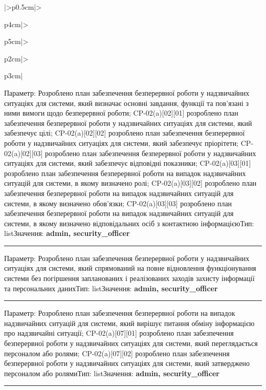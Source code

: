 \documentclass[10pt]{article}
\begin{document}
\begin{longtable}{|>{\centering\arraybackslash}p{0.5cm}|>{\raggedright\arraybackslash}p{4cm}|>{\raggedright\arraybackslash}p{5cm}|>{\raggedright\arraybackslash}p{2cm}|>{\raggedright\arraybackslash}p{3cm}|}
Параметр: Розроблено план забезпечення безперервної роботи у надзвичайних ситуаціях для системи, який визначає основні завдання, функції та пов'язані з ними вимоги щодо безперервної роботи; CP-02(a)[02][01] розроблено план забезпечення безперервної роботи у надзвичайних ситуаціях для системи, який забезпечує цілі; CP-02(a)[02][02] розроблено план забезпечення безперервної роботи у надзвичайних ситуаціях для системи, який забезпечує пріорітети; CP-02(a)[02][03] розроблено план забезпечення безперервної роботи у надзвичайних ситуаціях для системи, який забезпечує відповідні показники; CP-02(a)[03][01] розроблено план забезпечення безперервної роботи на випадок надзвичайних ситуацій для системи, в якому визначено ролі; CP-02(a)[03][02] розроблено план забезпечення безперервної роботи на випадок надзвичайних ситуацій для системи, в якому визначено обов'язки; CP-02(a)[03][03] розроблено план забезпечення безперервної роботи на випадок надзвичайних ситуацій для системи, в якому визначено відповідальних осіб з контактною інформацією\newline Тип: list\newline Значення: \textbf{admin, security\_\allowbreak{}officer}\vspace{1mm}\newline\noindent\rule{\linewidth}{0.4pt}\vspace{1mm}
Параметр: Розроблено план забезпечення безперервної роботи у надзвичайних ситуаціях для системи, який спрямований на повне відновлення функціонування системи без погіршення запланованих і реалізованих заходів захисту інформації та персональних даних\newline Тип: list\newline Значення: \textbf{admin, security\_\allowbreak{}officer}\vspace{1mm}\newline\noindent\rule{\linewidth}{0.4pt}\vspace{1mm}
Параметр: Розроблено план забезпечення безперервної роботи на випадок надзвичайних ситуацій для системи, який вирішує питання обміну інформацією про надзвичайні ситуації; CP-02(a)[07][01] розроблено план забезпечення безперервної роботи у надзвичайних ситуаціях для системи, який переглядається персоналом або ролями; CP-02(a)[07][02] розроблено план забезпечення безперервної роботи у надзвичайних ситуаціях для системи, який затверджено персоналом або ролями\newline Тип: list\newline Значення: \textbf{admin, security\_\allowbreak{}officer}\vspace{1mm}\newline\noindent\rule{\linewidth}{0.4pt}\vspace{1mm}

\end{longtable}
\end{document}
